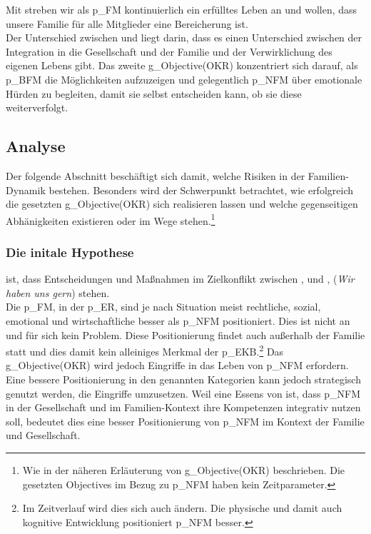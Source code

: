 Mit \NFMOFour streben wir als \gls{p_FM} kontinuierlich ein erfülltes Leben an und wollen, dass unsere Familie für alle Mitglieder eine Bereicherung ist.\\


Der Unterschied zwischen \NFMOOne und \NFMOFour liegt darin, dass es einen Unterschied zwischen der Integration in die Gesellschaft und der Familie und der Verwirklichung des eigenen Lebens gibt. Das zweite \gls{g_Objective(OKR)} konzentriert sich darauf, als \gls{p_BFM} die Möglichkeiten aufzuzeigen und gelegentlich \gls{p_NFM} über emotionale Hürden zu begleiten, damit sie selbst entscheiden kann, ob sie diese weiterverfolgt.

\subsection{Analyse} \label{sec:Risiko_EKB}
Der folgende Abschnitt beschäftigt sich damit, welche Risiken in der Familien-Dynamik bestehen. Besonders wird der Schwerpunkt betrachtet, wie erfolgreich die gesetzten \gls{g_Objective(OKR)} sich realisieren lassen und welche gegenseitigen Abhänigkeiten existieren oder im Wege stehen.\footnote{
	Wie in der näheren Erläuterung von \gls{g_Objective(OKR)} beschrieben. Die gesetzten Objectives im Bezug zu \gls{p_NFM} haben kein Zeitparameter.
}

\subsubsection{Die initale Hypothese} ist, dass Entscheidungen und Maßnahmen im Zielkonflikt zwischen \NFMOOne, \NFMOTwo und \NFMOThree, \NFMOFour (\textit{Wir haben uns gern}) stehen.\\


Die \gls{p_FM}, in der \gls{p_ER}, sind je nach Situation meist rechtliche, sozial, emotional und wirtschaftliche besser als \gls{p_NFM} positioniert. Dies ist nicht an und für sich kein Problem. Diese Positionierung findet auch außerhalb der Familie statt und dies damit kein alleiniges Merkmal der \gls{p_EKB}.\footnote{
	Im Zeitverlauf wird dies sich auch ändern. Die physische und damit auch kognitive Entwicklung positioniert \gls{p_NFM} besser.
}
Das \gls{g_Objective(OKR)}  wird jedoch Eingriffe in das Leben von \gls{p_NFM} erfordern. Eine bessere Positionierung in den genannten Kategorien kann jedoch strategisch genutzt werden, die Eingriffe umzusetzen. Weil eine Essens von  ist, dass
\gls{p_NFM} in der Gesellschaft und im Familien-Kontext ihre Kompetenzen integrativ nutzen soll, bedeutet dies eine besser Positionierung von \gls{p_NFM} im Kontext der Familie und Gesellschaft.\\
 


